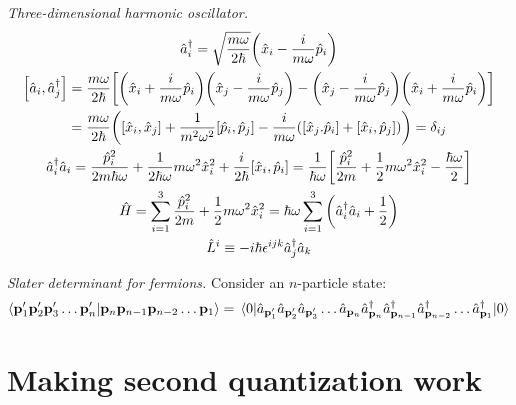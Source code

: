 \documentclass{report}
\begin{document}
\begin{subquests}
	\item \emph{Three-dimensional harmonic oscillator.}
	\begin{gather*}
		\hat{a}_i^{\dagger} = \sqrt{\frac{m\omega}{2\hbar}}\pqty{\hat{x}_i - \frac{i}{m\omega}\hat{p}_i} \\
		\bqty{\hat{a}_i,\hat{a}_j^{\dagger}} = \frac{m\omega}{2\hbar}\bqty{\pqty{\hat{x}_i + \frac{i}{m\omega}\hat{p}_i}\pqty{\hat{x}_j - \frac{i}{m\omega}\hat{p}_j} - \pqty{\hat{x}_j - \frac{i}{m\omega}\hat{p}_j}\pqty{\hat{x}_i + \frac{i}{m\omega}\hat{p}_i}} \\
		= \frac{m\omega}{2\hbar}\pqty{\bqty{\hat{x}_i,\hat{x}_j} + \frac{1}{m^2\omega^2}\bqty{\hat{p}_i,\hat{p}_j} - \frac{i}{m\omega}\pqty{\bqty{\hat{x}_j.\hat{p}_i} + \bqty{\hat{x}_i,\hat{p}_j}}} = \delta_{ij} \\
		\hat{a}_i^{\dagger}\hat{a}_i = \frac{\hat{p}_i^2}{2m\hbar\omega} + \frac{1}{2\hbar\omega}m\omega^2\hat{x}_i^2 + \frac{i}{2\hbar}\bqty{\hat{x}_i, \hat{p}_i } = \frac{1}{\hbar\omega}\bqty{\frac{\hat{p}_i^2}{2m} + \frac{1}{2}m\omega^2\hat{x}_i^2 - \frac{\hbar\omega}{2}} \\
		\hat{H} = \sum_{i=1}^3\frac{\hat{p}_i^2}{2m} + \frac{1}{2}m\omega^2\hat{x}_i^2 = \hbar\omega \sum_{i=1}^3 \pqty{\hat{a}_i^{\dagger} \hat{a}_i + \frac{1}{2}} \\
		\hat{L}^i \equiv -i\hbar\epsilon^{ijk}\hat{a}^{\dagger}_j\hat{a}_k		
	\end{gather*}

	\item \emph{Slater determinant for fermions.} Consider an $n$-particle state:
	\begin{gather*}
		\braket{\vb{p}'_1 \vb{p}'_2 \vb{p}'_3\dots \vb{p}'_n}{\vb{p}_n \vb{p}_{n-1} \vb{p}_{n-2} \dots \vb{p}_1} = \mel{0}{\hat{a}_{\vb p'_1}\hat{a}_{\vb p'_2} \hat{a}_{\vb p'_3} \dots \hat{a}_{\vb p_n} \hat{a}^{\dagger}_{\vb p_n} \hat{a}^{\dagger}_{\vb p_{n-1}} \hat{a}^{\dagger}_{\vb p_{n-2}}\dots \hat{a}^{\dagger}_{\vb p_1}}{0} 
	\end{gather*}
\end{subquests}


\chapter{Making second quantization work}
\end{document}
